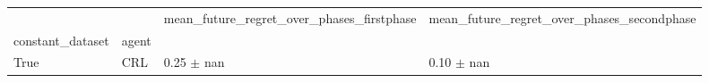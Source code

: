 \begin{tabular}{llll}
\toprule
 &  & mean_future_regret_over_phases_firstphase & mean_future_regret_over_phases_secondphase \\
constant_dataset & agent &  &  \\
\midrule
True & CRL & 0.25 $\pm$ nan & 0.10 $\pm$ nan \\
\cline{1-4}
\bottomrule
\end{tabular}
